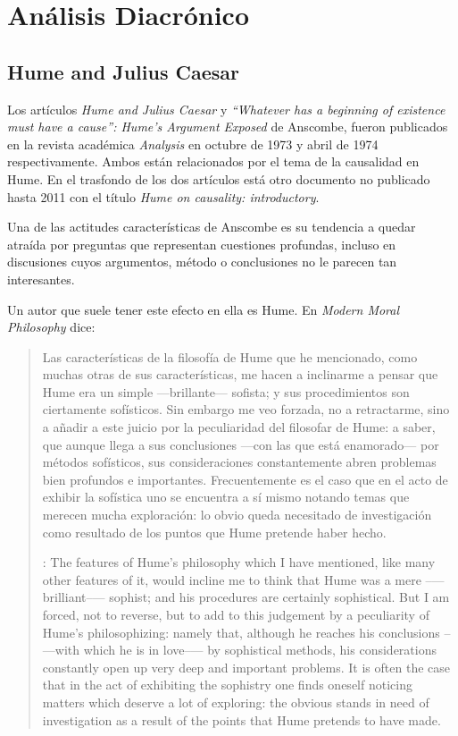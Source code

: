\section{Análisis Diacrónico}

\subsection{Hume and Julius Caesar}

Los artículos \emph{Hume and Julius Caesar} y \emph{``Whatever has a beginning
  of existence must have a cause'': Hume’s Argument Exposed} de Anscombe, fueron
publicados en la revista académica \emph{Analysis} en octubre de 1973 y abril de
1974 respectivamente. Ambos están relacionados por el tema de la causalidad en
Hume. En el trasfondo de los dos artículos está otro documento no publicado
hasta 2011 con el título \emph{Hume on causality: introductory}.

Una de las actitudes características de Anscombe es su tendencia a quedar
atraída por preguntas que representan cuestiones profundas, incluso en
discusiones cuyos argumentos, método o conclusiones no le parecen tan
interesantes.

Un autor que suele tener este efecto en ella es Hume. En \emph{Modern Moral
  Philosophy} dice:

\blockquote[{\cite[172]{anscombe1981mmph}}: The features of Hume’s philosophy
which I have mentioned, like many other features of it, would incline me to
think that Hume was a mere --—brilliant--— sophist; and his procedures are
certainly sophistical. But I am forced, not to reverse, but to add to this
judgement by a peculiarity of Hume’s philosophizing: namely that, although he
reaches his conclusions --—with which he is in love--— by sophistical methods,
his considerations constantly open up very deep and important problems. It is
often the case that in the act of exhibiting the sophistry one finds oneself
noticing matters which deserve a lot of exploring: the obvious stands in need of
investigation as a result of the points that Hume pretends to have made.]{Las
  características de la filosofía de Hume que he mencionado, como muchas otras
  de sus características, me hacen a inclinarme a pensar que Hume era un simple
  ---brillante--- sofista; y sus procedimientos son ciertamente sofísticos. Sin
  embargo me veo forzada, no a retractarme, sino a añadir a este juicio por la
  peculiaridad del filosofar de Hume: a saber, que aunque llega a sus
  conclusiones ---con las que está enamorado--- por métodos sofísticos, sus
  consideraciones constantemente abren problemas bien profundos e importantes.
  Frecuentemente es el caso que en el acto de exhibir la sofística uno se
  encuentra a sí mismo notando temas que merecen mucha exploración: lo obvio
  queda necesitado de investigación como resultado de los puntos que Hume
  pretende haber hecho.}


